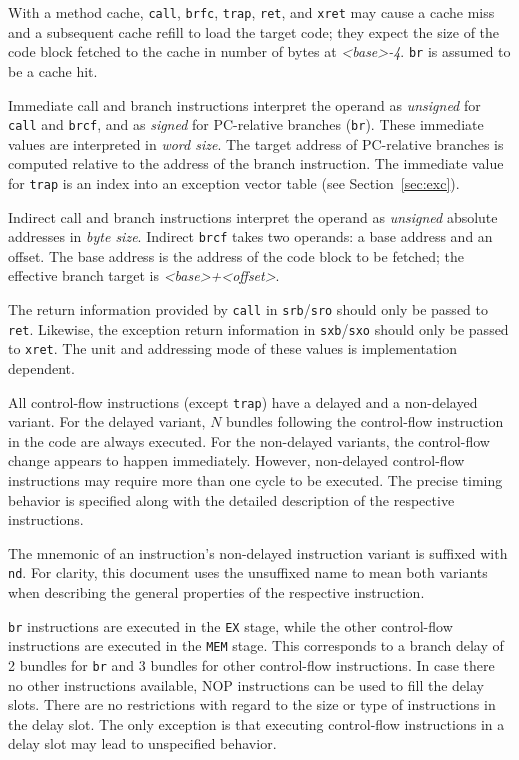 \documentclass[a4paper,fontsize=10pt,twoside,DIV15,BCOR12mm,headinclude=true,footinclude=false,pagesize,bibtotoc]{scrbook}
\newcommand{\comment}[3]{

\textsf{\textbf{#1}} {\color{#3}#2}}
\newcommand{\wolf}[1]{\comment{Wolfgang}{#1}{OliveGreen}}
\renewcommand{\wolf}[1]{}
\begin{document}
With a method cache, \texttt{call}, \texttt{brfc}, \texttt{trap},
\texttt{ret}, and \texttt{xret} may cause a cache miss and a
subsequent cache refill to load the target code; they expect the size
of the code block fetched to the cache in number of bytes at
\textit{<base>-4}. \texttt{br} is assumed to be a cache hit.

Immediate call and branch instructions interpret the operand as
\emph{unsigned} for \texttt{call} and \texttt{brcf}, and as
\emph{signed} for PC-relative branches (\texttt{br}). These immediate
values are interpreted in \emph{word size}. The target address of
PC-relative branches is computed relative to the address of the branch
instruction. The immediate value for \texttt{trap} is an index into an
exception vector table (see Section~\ref{sec:exc}).

Indirect call and branch instructions interpret the operand as
\emph{unsigned} absolute addresses in \emph{byte size}. Indirect
\texttt{brcf} takes two operands: a base address and an offset. The
base address is the address of the code block to be fetched; the
effective branch target is \textit{<base>+<offset>}.

The return information provided by \texttt{call} in
\texttt{srb}/\texttt{sro} should only be passed to
\texttt{ret}. Likewise, the exception return information in
\texttt{sxb}/\texttt{sxo} should only be passed to \texttt{xret}. The
unit and addressing mode of these values is implementation
dependent.\wolf{Should we keep it implementation dependent, or should
  we enforce way it is in the current implementation?}

All control-flow instructions (except \texttt{trap}) have a delayed
and a non-delayed variant. For the delayed variant, $N$
bundles following the control-flow instruction in the code are always
executed. For the non-delayed variants, the control-flow change
appears to happen immediately. However, non-delayed control-flow
instructions may require more than one cycle to be executed. The
precise timing behavior is specified along with the detailed
description of the respective instructions.

The mnemonic of an instruction's non-delayed instruction variant is
suffixed with \texttt{nd}. For clarity, this document uses the
unsuffixed name to mean both variants when describing the general
properties of the respective instruction.

\texttt{br} instructions are executed in the \texttt{EX} stage, while
the other control-flow instructions are executed in the \texttt{MEM}
stage. This corresponds to a branch delay of 2 bundles for \texttt{br}
and 3 bundles for other control-flow instructions. In case there no
other instructions available, NOP instructions can be used to fill the
delay slots. There are no restrictions with regard to the size or type
of instructions in the delay slot. The only exception is that
executing control-flow instructions in a delay slot may lead to
unspecified behavior.
\end{document}
